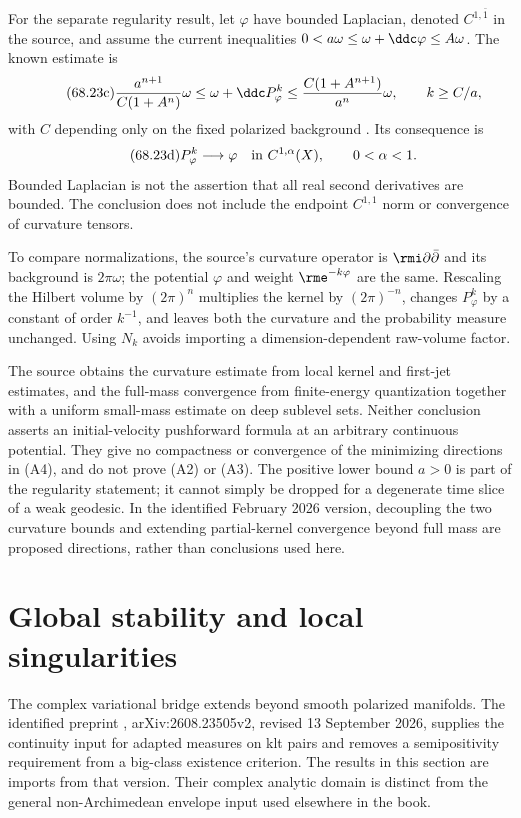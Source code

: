For the separate regularity result, let $\varphi$ have bounded
Laplacian, denoted $C^{1,\bar1}$ in the source, and assume the current
inequalities $0<a\omega\leq\omega+\ddc\varphi\leq A\omega$.
The known estimate is
\[
\tag{68.23c}\label{eq:ytd-bergman-curvature-bounds}
 \frac{a^{n+1}}{C(1+A^n)}\omega
 \leq\omega+\ddc P^k_\varphi
 \leq\frac{C(1+A^{n+1})}{a^n}\omega,
 \qquad k\geq C/a,
\]
with $C$ depending only on the fixed polarized background
\cite[Theorem~1.1]{BlockiDarvas26Radon}. Its consequence is
\[
\tag{68.23d}\label{eq:ytd-bergman-c1alpha}
 P^k_\varphi\longrightarrow\varphi
 \quad\hbox{in }C^{1,\alpha}(X),\qquad 0<\alpha<1.
\]
Bounded Laplacian is not the assertion that all real second
derivatives are bounded. The conclusion does not include the endpoint
$C^{1,1}$ norm or convergence of curvature tensors.

To compare normalizations, the source's curvature operator is
$\rmi\partial\bar\partial$ and its background is $2\pi\omega$;
the potential $\varphi$ and weight $\rme^{-k\varphi}$ are the same.
Rescaling the Hilbert volume by $(2\pi)^n$ multiplies the kernel by
$(2\pi)^{-n}$, changes $P^k_\varphi$ by a constant of order $k^{-1}$,
and leaves both the curvature and the probability measure unchanged.
Using $N_k$ avoids importing a dimension-dependent raw-volume factor.

The source obtains the curvature estimate from local kernel and
first-jet estimates, and the full-mass convergence from finite-energy
quantization together with a uniform small-mass estimate on deep
sublevel sets. Neither conclusion asserts an initial-velocity
pushforward formula at an arbitrary continuous potential. They give
no compactness or convergence of the minimizing directions in (A4),
and do not prove (A2) or (A3). The positive lower bound $a>0$ is part
of the regularity statement; it cannot simply be dropped for a
degenerate time slice of a weak geodesic. In the identified February
2026 version, decoupling the two curvature bounds and extending
partial-kernel convergence beyond full mass are proposed directions,
rather than conclusions used here.

\section{Global stability and local singularities}
\label{sec:ytd-klt-adapted-stability}

The complex variational bridge extends beyond smooth polarized
manifolds. The identified preprint \cite{DarvasZhang26KltV2},
arXiv:2608.23505v2, revised 13 September 2026, supplies the
continuity input for adapted measures on klt pairs and removes a
semipositivity requirement from a big-class existence criterion.
The results in this section are imports from that version. Their
complex analytic domain is distinct from the general
non-Archimedean envelope input used elsewhere in the book.

